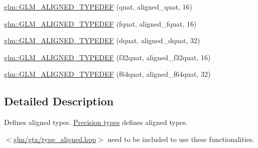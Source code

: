 \begin{DoxyCompactItemize}
\item 
\hyperlink{group__gtx__type__aligned_gafd945a8ea86b042aba410e0560df9a3d}{glm\-::\-G\-L\-M\-\_\-\-A\-L\-I\-G\-N\-E\-D\-\_\-\-T\-Y\-P\-E\-D\-E\-F} (quat, aligned\-\_\-quat, 16)
\item 
\hyperlink{group__gtx__type__aligned_gad8c4bfacff70e57dc8303634c8bfce35}{glm\-::\-G\-L\-M\-\_\-\-A\-L\-I\-G\-N\-E\-D\-\_\-\-T\-Y\-P\-E\-D\-E\-F} (fquat, aligned\-\_\-fquat, 16)
\item 
\hyperlink{group__gtx__type__aligned_gaabc28c84a3288b697605d4688686f9a9}{glm\-::\-G\-L\-M\-\_\-\-A\-L\-I\-G\-N\-E\-D\-\_\-\-T\-Y\-P\-E\-D\-E\-F} (dquat, aligned\-\_\-dquat, 32)
\item 
\hyperlink{group__gtx__type__aligned_ga1ed8aeb5ca67fade269a46105f1bf273}{glm\-::\-G\-L\-M\-\_\-\-A\-L\-I\-G\-N\-E\-D\-\_\-\-T\-Y\-P\-E\-D\-E\-F} (f32quat, aligned\-\_\-f32quat, 16)
\item 
\hyperlink{group__gtx__type__aligned_ga95cc03b8b475993fa50e05e38e203303}{glm\-::\-G\-L\-M\-\_\-\-A\-L\-I\-G\-N\-E\-D\-\_\-\-T\-Y\-P\-E\-D\-E\-F} (f64quat, aligned\-\_\-f64quat, 32)
\end{DoxyCompactItemize}


\subsection{Detailed Description}
Defines aligned types. \hyperlink{group__core__precision}{Precision types} defines aligned types.

$<$\hyperlink{type__aligned_8hpp}{glm/gtx/type\-\_\-aligned.\-hpp}$>$ need to be included to use these functionalities. 

